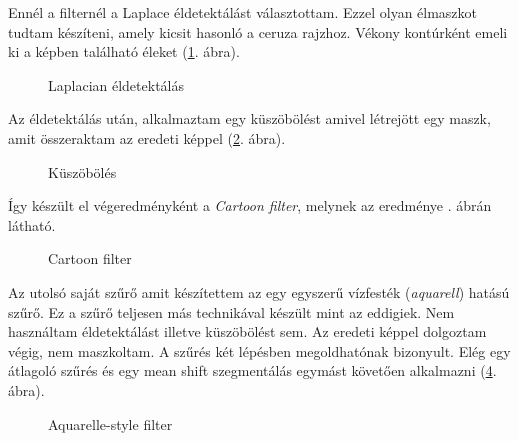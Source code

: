 
Ennél a filternél a Laplace éldetektálást választottam. Ezzel olyan élmaszkot tudtam készíteni, amely kicsit hasonló a ceruza rajzhoz. Vékony kontúrként emeli ki a képben található éleket (\ref{fig:2_cartoon3}. ábra).


\begin{figure}[ht]
\centering
{}
\caption{Laplacian éldetektálás} 
\label{fig:2_cartoon3}
\end{figure}


Az éldetektálás után, alkalmaztam egy küszöbölést amivel létrejött egy maszk, amit összeraktam az eredeti képpel (\ref{fig:2_cartoon4}. ábra).

\begin{figure}[ht]
\centering
{}
\caption{Küszöbölés} 
\label{fig:2_cartoon4}
\end{figure}

Így készült el végeredményként a \textit{Cartoon filter}, melynek az eredménye . ábrán látható.

\begin{figure}[ht]
\centering
{}
\caption{Cartoon filter} 
\label{fig:2_cartoon5}
\end{figure}



Az utolsó saját szűrő amit készítettem az egy egyszerű vízfesték (\textit{aquarell}) hatású szűrő. Ez a szűrő teljesen más technikával készült mint az eddigiek. Nem használtam éldetektálást illetve küszöbölést sem. Az eredeti képpel dolgoztam végig, nem maszkoltam. A szűrés két lépésben megoldhatónak bizonyult. Elég egy átlagoló szűrés és egy mean shift szegmentálás egymást követően alkalmazni (\ref{fig:paint}. ábra).

\begin{figure}[ht]
\centering
{}
\caption{Aquarelle-style filter} 
\label{fig:paint}
\end{figure}

